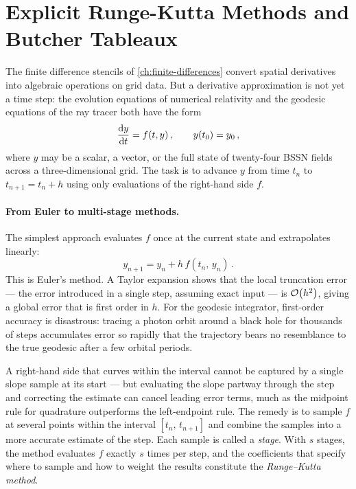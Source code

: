 \section{Explicit Runge-Kutta Methods and Butcher Tableaux}
\label{sec:rk-butcher}

The finite difference stencils of \cref{ch:finite-differences} convert
spatial derivatives into algebraic operations on grid data.  But a
derivative approximation is not yet a time step: the evolution equations
of numerical relativity and the geodesic equations of the ray tracer both
have the form
%
\begin{equation}
  \frac{\mathrm{d} y}{\mathrm{d} t} = f(t, y) \,, \qquad y(t_0) = y_0 \,,
  \label{eq:ivp}
\end{equation}
%
where $y$ may be a scalar, a vector, or the full state of twenty-four
BSSN fields across a three-dimensional grid.  The task is to advance
$y$ from time $t_n$ to $t_{n+1} = t_n + h$ using only evaluations
of the right-hand side $f$.

\paragraph{From Euler to multi-stage methods.}

The simplest approach evaluates $f$ once at the current state and
extrapolates linearly:
%
\begin{equation}
  y_{n+1} = y_n + h\,f(t_n,\, y_n) \,.
  \label{eq:euler}
\end{equation}
%
This is Euler's method.  A Taylor expansion shows that the local
truncation error --- the error introduced in a single step, assuming
exact input --- is $\mathcal{O}\!\left(h^2\right)$, giving a global error that is first
order in $h$.  For the geodesic integrator, first-order accuracy is
disastrous: tracing a photon orbit around a black hole for thousands of
steps accumulates error so rapidly that the trajectory bears no
resemblance to the true geodesic after a few orbital periods.

A right-hand side that curves within the interval cannot be captured by a
single slope sample at its start --- but evaluating the slope partway
through the step and correcting the estimate can cancel leading error
terms, much as the midpoint rule for quadrature outperforms the
left-endpoint rule.  The remedy is to sample $f$ at several points within
the interval $[t_n,\, t_{n+1}]$ and combine the samples into a more
accurate estimate of the step.  Each sample is called a \emph{stage}.
With $s$ stages, the method evaluates $f$ exactly $s$ times per step,
and the coefficients that specify where to sample and how to weight
the results constitute the \emph{Runge--Kutta method}.

